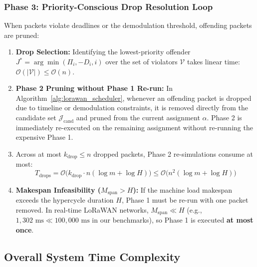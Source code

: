 \documentclass{article}
\begin{document}
\subsubsection{Phase 3: Priority-Conscious Drop Resolution Loop}
When packets violate deadlines or the demodulation threshold, offending packets are pruned:
\begin{enumerate}
    \item \textbf{Drop Selection:} Identifying the lowest-priority offender $J^* = \arg\min (\Pi_i, -D_i, i)$ over the set of violators $\mathcal{V}$ takes linear time: $\mathcal{O}(|\mathcal{V}|) \le \mathcal{O}(n)$.
    \item \textbf{Phase 2 Pruning without Phase 1 Re-run:} In Algorithm~\ref{alg:lorawan_scheduler}, whenever an offending packet is dropped due to timeline or demodulation constraints, it is removed directly from the candidate set $\mathcal{J}_{\text{cand}}$ and pruned from the current assignment $\alpha$. Phase 2 is immediately re-executed on the remaining assignment without re-running the expensive Phase 1.
    \item Across at most $k_{\text{drop}} \le n$ dropped packets, Phase 2 re-simulations consume at most:
    \begin{equation}
    T_{\text{drops}} = \mathcal{O}\Big(k_{\text{drop}} \cdot n (\log m + \log H)\Big) \le \mathcal{O}\Big(n^2 (\log m + \log H)\Big)
    \end{equation}
    \item \textbf{Makespan Infeasibility ($M_{\text{span}} > H$):} If the machine load makespan exceeds the hypercycle duration $H$, Phase 1 must be re-run with one packet removed. In real-time LoRaWAN networks, $M_{\text{span}} \ll H$ (e.g., $1{,}302\text{ ms} \ll 100{,}000\text{ ms}$ in our benchmarks), so Phase 1 is executed \textbf{at most once}.
\end{enumerate}

\subsection{Overall System Time Complexity}
\end{document}
